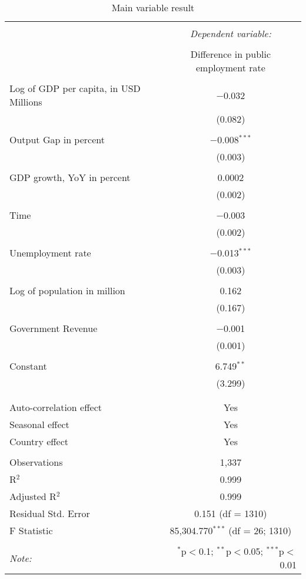 
\begin{table}[!htbp] \centering 
  \caption{Main variable result} 
  \label{} 
\begin{tabular}{@{\extracolsep{5pt}}lc} 
\\[-1.8ex]\hline 
\hline \\[-1.8ex] 
 & \multicolumn{1}{c}{\textit{Dependent variable:}} \\ 
\cline{2-2} 
\\[-1.8ex] & Difference in public employment rate \\ 
\hline \\[-1.8ex] 
 Log of GDP per capita, in USD Millions & $-$0.032 \\ 
  & (0.082) \\ 
  & \\ 
 Output Gap in percent & $-$0.008$^{***}$ \\ 
  & (0.003) \\ 
  & \\ 
 GDP growth, YoY in percent & 0.0002 \\ 
  & (0.002) \\ 
  & \\ 
 Time & $-$0.003 \\ 
  & (0.002) \\ 
  & \\ 
 Unemployment rate & $-$0.013$^{***}$ \\ 
  & (0.003) \\ 
  & \\ 
 Log of population in million & 0.162 \\ 
  & (0.167) \\ 
  & \\ 
 Government Revenue & $-$0.001 \\ 
  & (0.001) \\ 
  & \\ 
 Constant & 6.749$^{**}$ \\ 
  & (3.299) \\ 
  & \\ 
\hline \\[-1.8ex] 
Auto-correlation effect & Yes \\ 
Seasonal effect & Yes \\ 
Country effect & Yes \\ 
\hline \\[-1.8ex] 
Observations & 1,337 \\ 
R$^{2}$ & 0.999 \\ 
Adjusted R$^{2}$ & 0.999 \\ 
Residual Std. Error & 0.151 (df = 1310) \\ 
F Statistic & 85,304.770$^{***}$ (df = 26; 1310) \\ 
\hline 
\hline \\[-1.8ex] 
\textit{Note:}  & \multicolumn{1}{r}{$^{*}$p$<$0.1; $^{**}$p$<$0.05; $^{***}$p$<$0.01} \\ 
\end{tabular} 
\end{table} 
